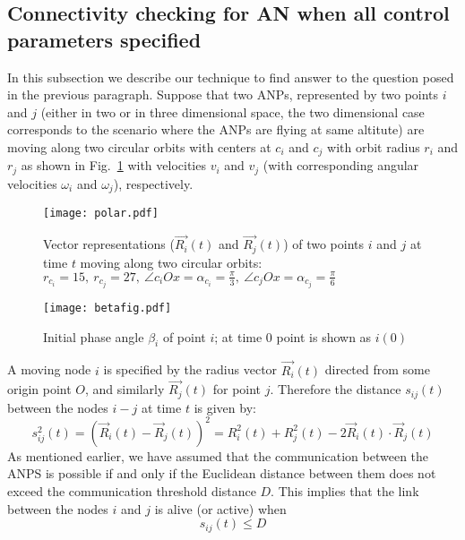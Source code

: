 \documentclass[10pt]{IEEEtran}
\begin{document}
\subsection {Connectivity checking for AN when all control parameters specified}

In this subsection we describe our technique to find answer to the question posed in the previous paragraph. Suppose that two ANPs, represented by two points $i$ and $j$ (either in two or in three dimensional space, the two dimensional case corresponds to the scenario where the ANPs are flying at same altitute) are moving along two circular orbits with centers at $c_{i}$ and $c_{j}$ with orbit radius $r_{i}$ and $r_{j}$  as shown in Fig.~\ref{fig:pavelpolar} with velocities $v_{i}$ and $v_{j}$ (with corresponding angular velocities $\omega_{i}$ and $\omega_{j}$), respectively.
\begin{figure}[!t]
 \centering
\texttt{[image: polar.pdf]}
\caption{Vector representations ($\vec{R_{i}}(t)$ and $\vec{R_{j}}(t)$) of two points $i$ and $j$ at time $t$ moving along two circular orbits: $r_{c_{i}}=15,~r_{c_{j}}=27,~\angle{c_{i}Ox}=\alpha_{c_{i}}=\frac{\pi}{3},~\angle{c_{j}Ox}=\alpha_{c_{j}}=\frac{\pi}{6}$}
\label{fig:pavelpolar}
\end{figure}
\begin{figure}[!t]
\centering
\texttt{[image: betafig.pdf]}
\caption{Initial phase angle $\beta_{i}$ of point $i$; at time $0$ point is shown as $i(0)$}
\label{fig:betafig}
\end{figure}

A moving  node $i$ is specified by the radius vector $\vec{R_{i}}(t)$ directed from some origin point $O$, and similarly $\vec{R_{j}}(t)$ for point $j$. Therefore the distance $s_{ij}(t)$ between the nodes $i-j$ at  time $t$ is given by:
\begin{equation}
s^{2}_{ij}(t)=(\vec R_{i}(t)-\vec R_{j}(t))^{2}= R_{i}^{2}(t) +  R_{j}^{2}(t) - 2 \vec R_{i}(t) \cdot \vec R_{j}(t)
 \label{eq:vs}
 \end{equation}
As mentioned earlier, we have assumed that the communication between the ANPS is possible if and only if the Euclidean distance between them does not exceed the communication threshold distance $D$. This implies that the link between the nodes $i$ and $j$ is alive (or active) when 
\begin{equation}
s_{ij}(t) \leq D
\label{eq:sD}
\end{equation}
\end{document}

